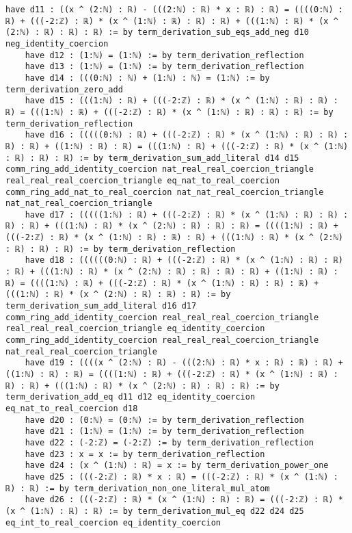 \documentclass{article}
\begin{document}
\begin{tcolorbox}[colback=white!10, width=\linewidth]
\begin{lstlisting}[language=Lean4]
    have d11 : ((x ^ (2:ℕ) : ℝ) - (((2:ℕ) : ℝ) * x : ℝ) : ℝ) = ((((0:ℕ) : ℝ) + (((-2:ℤ) : ℝ) * (x ^ (1:ℕ) : ℝ) : ℝ) : ℝ) + (((1:ℕ) : ℝ) * (x ^ (2:ℕ) : ℝ) : ℝ) : ℝ) := by term_derivation_sub_eqs_add_neg d10 neg_identity_coercion
    have d12 : (1:ℕ) = (1:ℕ) := by term_derivation_reflection
    have d13 : (1:ℕ) = (1:ℕ) := by term_derivation_reflection
    have d14 : (((0:ℕ) : ℕ) + (1:ℕ) : ℕ) = (1:ℕ) := by term_derivation_zero_add
    have d15 : (((1:ℕ) : ℝ) + (((-2:ℤ) : ℝ) * (x ^ (1:ℕ) : ℝ) : ℝ) : ℝ) = (((1:ℕ) : ℝ) + (((-2:ℤ) : ℝ) * (x ^ (1:ℕ) : ℝ) : ℝ) : ℝ) := by term_derivation_reflection
    have d16 : (((((0:ℕ) : ℝ) + (((-2:ℤ) : ℝ) * (x ^ (1:ℕ) : ℝ) : ℝ) : ℝ) : ℝ) + ((1:ℕ) : ℝ) : ℝ) = (((1:ℕ) : ℝ) + (((-2:ℤ) : ℝ) * (x ^ (1:ℕ) : ℝ) : ℝ) : ℝ) := by term_derivation_sum_add_literal d14 d15 comm_ring_add_identity_coercion nat_real_real_coercion_triangle real_real_real_coercion_triangle eq_nat_to_real_coercion comm_ring_add_nat_to_real_coercion nat_nat_real_coercion_triangle nat_nat_real_coercion_triangle
    have d17 : (((((1:ℕ) : ℝ) + (((-2:ℤ) : ℝ) * (x ^ (1:ℕ) : ℝ) : ℝ) : ℝ) : ℝ) + (((1:ℕ) : ℝ) * (x ^ (2:ℕ) : ℝ) : ℝ) : ℝ) = ((((1:ℕ) : ℝ) + (((-2:ℤ) : ℝ) * (x ^ (1:ℕ) : ℝ) : ℝ) : ℝ) + (((1:ℕ) : ℝ) * (x ^ (2:ℕ) : ℝ) : ℝ) : ℝ) := by term_derivation_reflection
    have d18 : ((((((0:ℕ) : ℝ) + (((-2:ℤ) : ℝ) * (x ^ (1:ℕ) : ℝ) : ℝ) : ℝ) + (((1:ℕ) : ℝ) * (x ^ (2:ℕ) : ℝ) : ℝ) : ℝ) : ℝ) + ((1:ℕ) : ℝ) : ℝ) = ((((1:ℕ) : ℝ) + (((-2:ℤ) : ℝ) * (x ^ (1:ℕ) : ℝ) : ℝ) : ℝ) + (((1:ℕ) : ℝ) * (x ^ (2:ℕ) : ℝ) : ℝ) : ℝ) := by term_derivation_sum_add_literal d16 d17 comm_ring_add_identity_coercion real_real_real_coercion_triangle real_real_real_coercion_triangle eq_identity_coercion comm_ring_add_identity_coercion real_real_real_coercion_triangle nat_real_real_coercion_triangle
    have d19 : ((((x ^ (2:ℕ) : ℝ) - (((2:ℕ) : ℝ) * x : ℝ) : ℝ) : ℝ) + ((1:ℕ) : ℝ) : ℝ) = ((((1:ℕ) : ℝ) + (((-2:ℤ) : ℝ) * (x ^ (1:ℕ) : ℝ) : ℝ) : ℝ) + (((1:ℕ) : ℝ) * (x ^ (2:ℕ) : ℝ) : ℝ) : ℝ) := by term_derivation_add_eq d11 d12 eq_identity_coercion eq_nat_to_real_coercion d18
    have d20 : (0:ℕ) = (0:ℕ) := by term_derivation_reflection
    have d21 : (1:ℕ) = (1:ℕ) := by term_derivation_reflection
    have d22 : (-2:ℤ) = (-2:ℤ) := by term_derivation_reflection
    have d23 : x = x := by term_derivation_reflection
    have d24 : (x ^ (1:ℕ) : ℝ) = x := by term_derivation_power_one
    have d25 : (((-2:ℤ) : ℝ) * x : ℝ) = (((-2:ℤ) : ℝ) * (x ^ (1:ℕ) : ℝ) : ℝ) := by term_derivation_non_one_literal_mul_atom
    have d26 : (((-2:ℤ) : ℝ) * (x ^ (1:ℕ) : ℝ) : ℝ) = (((-2:ℤ) : ℝ) * (x ^ (1:ℕ) : ℝ) : ℝ) := by term_derivation_mul_eq d22 d24 d25 eq_int_to_real_coercion eq_identity_coercion

\end{lstlisting}
\end{tcolorbox}
\end{document}
